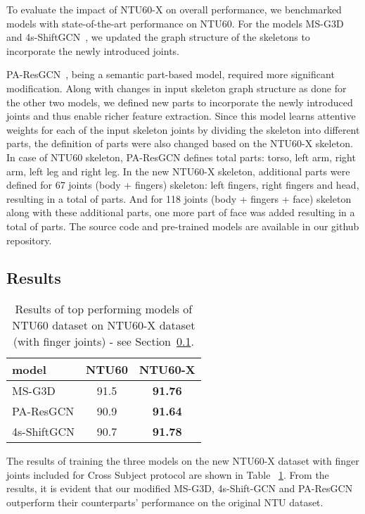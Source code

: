 \documentclass{article}
\begin{document}
To evaluate the impact of NTU60-X on overall performance, we benchmarked models with state-of-the-art performance on NTU60. For the models MS-G3D~\cite{liu2020disentangling} and 4s-ShiftGCN~\cite{cheng2020shiftgcn}, we updated the graph structure of the skeletons to incorporate the newly introduced joints.

PA-ResGCN~\cite{song2020stronger}, being a semantic part-based model, required more significant modification. Along with changes in input skeleton graph structure as done for the other two models, we defined new parts to incorporate the newly introduced joints and thus enable richer feature extraction. Since this model learns attentive weights for each of the input skeleton joints by dividing the skeleton into different parts, the definition of parts were also changed based on the NTU60-X skeleton. In case of NTU60 skeleton, PA-ResGCN defines total  parts: torso, left arm, right arm, left leg and right leg. In the new NTU60-X skeleton,  additional parts were defined for 67 joints (body + fingers) skeleton: left fingers, right fingers and head, resulting in a total of  parts. And for 118 joints (body + fingers + face) skeleton along with these  additional parts, one more part of face was added resulting in a total of  parts. The source code and pre-trained models are available in our github repository.

\subsection{Results}
\label{subsec:results}

\begin{table}[!t]
\resizebox{\linewidth}{!}
 {\centering 
 \begin{tabular}{l|c|c}
  \toprule
   model & NTU60 & NTU60-X \\
   \midrule
   MS-G3D\cite{liu2020disentangling} & 91.5 & \textbf{91.76} \\
   PA-ResGCN\cite{song2020stronger} & 90.9 & \textbf{91.64} \\
   4s-ShiftGCN\cite{cheng2020shiftgcn} & 90.7 & \textbf{91.78} \\
       
  \bottomrule
 \end{tabular}
  }
\caption{\label{tab:results} Results of top performing models of NTU60 dataset on NTU60-X dataset (with finger joints) - see Section~\ref{subsec:results}.}
\end{table}

The results of training the three models on the new NTU60-X dataset with finger joints included for Cross Subject protocol are shown in Table ~\ref{tab:results}. From the results, it is evident that our modified MS-G3D, 4s-Shift-GCN and PA-ResGCN outperform their counterparts' performance on the original NTU dataset. 
\end{document}
